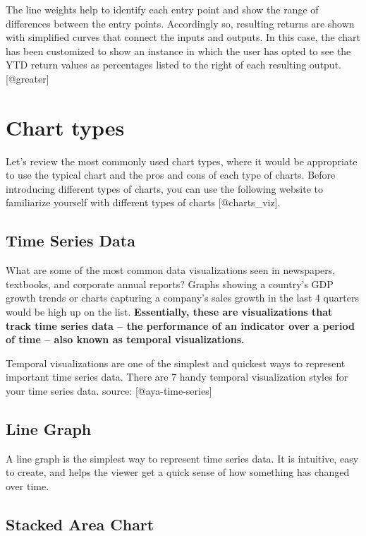 \documentclass[]{book}
\theoremstyle{definition}
\theoremstyle{definition}
\theoremstyle{definition}
\theoremstyle{remark}
\begin{document}
The line weights help to identify each entry point and show the range of
differences between the entry points. Accordingly so, resulting returns
are shown with simplified curves that connect the inputs and outputs. In
this case, the chart has been customized to show an instance in which
the user has opted to see the YTD return values as percentages listed to
the right of each resulting output.{[}@greater{]}

\section{Chart types}\label{chart-types}

Let's review the most commonly used chart types, where it would be
appropriate to use the typical chart and the pros and cons of each type
of charts. Before introducing different types of charts, you can use the
following website to familiarize yourself with different types of charts
{[}@charts\_viz{]}.

\subsection{Time Series Data}\label{time-series-data}

What are some of the most common data visualizations seen in newspapers,
textbooks, and corporate annual reports? Graphs showing a country's GDP
growth trends or charts capturing a company's sales growth in the last 4
quarters would be high up on the list. \textbf{Essentially, these are
visualizations that track time series data -- the performance of an
indicator over a period of time -- also known as temporal
visualizations.}

Temporal visualizations are one of the simplest and quickest ways to
represent important time series data. There are 7 handy temporal
visualization styles for your time series data. source:
{[}@aya-time-series{]}

\subsection{Line Graph}\label{line-graph}

A line graph is the simplest way to represent time series data. It is
intuitive, easy to create, and helps the viewer get a quick sense of how
something has changed over time.

\subsection{Stacked Area Chart}\label{stacked-area-chart}
\end{document}
